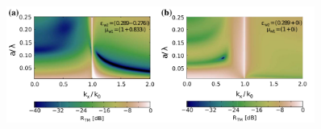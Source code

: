\documentclass{beamer}
\begin{document}
\begin{frame} [t]
\begin{columns}
\begin{column}{0.6\textwidth}
			\begin{figure}
						\includegraphics[width=0.9\textwidth]{../images/pml/oqe_reflection_kat_simp.png}
			\end{figure}

		\end{column}

	\end{columns}
		
\end{frame}
\end{document}
